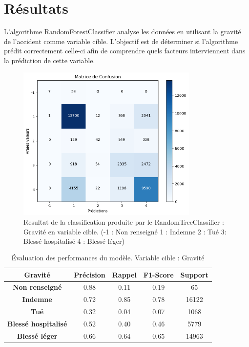 \documentclass[french]{article}
\begin{document}
\section{Résultats}
L'algorithme RandomForestClassifier analyse les données en utilisant la gravité de l'accident comme variable cible. L'objectif est de déterminer si l'algorithme prédit correctement celle-ci afin de comprendre quels facteurs interviennent dans la prédiction de cette variable.
\begin{figure}[h]
  \centering
  \includegraphics[width=0.8\textwidth]{img/confusionmatrix.png}
  \caption{Resultat de la classification produite par le RandomTreeClassifier : Gravité en variable cible.
  (-1 : Non renseigné
  1 : Indemne
  2 : Tué
   3: Blessé hospitalisé
   4 : Blessé léger)}
  \label{fig:nom_figure}
\end{figure}

\begin{table}[h]
  \centering
  \begin{tabular}{|c|c|c|c|c|}
    \hline
    \textbf{Gravité} & \textbf{Précision} & \textbf{Rappel} & \textbf{F1-Score} & \textbf{Support} \\
    \hline
    \textbf{Non renseigné} & 0.88 & 0.11 & 0.19 & 65 \\
    \hline
    \textbf{Indemne} & 0.72    &  0.85   &   0.78   &  16122 \\
    \hline
    \textbf{Tué} & 0.32   &   0.04   &   0.07   &   1068 \\
    \hline
    \textbf{Blessé hospitalisé} & 0.52   &   0.40   &   0.46   &   5779 \\
    \hline
    \textbf{Blessé léger} & 0.66   &   0.64   &   0.65  &   14963 \\
    \hline
  \end{tabular}
  \caption{Évaluation des performances du modèle. Variable cible : Gravité}
  \label{tab:evaluation_modele}
\end{table}
\end{document}
